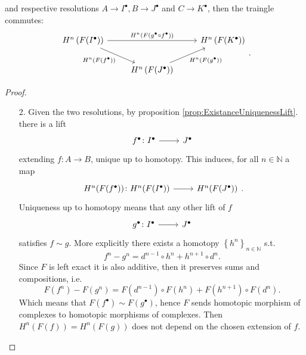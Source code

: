 \documentclass[../Main]{subfiles}
\begin{document}
\begin{prop}
\begin{enumerate}
	and respective resolutions $A \to I^\bullet, B \to J^\bullet$
	and $C \to K^\bullet$, then the traingle commutes:
	\begin{equation}
	\begin{tikzcd}
		H^{n} \left( F(I^\bullet) \right) 
		\arrow[rr, "H^{n} \left( F(g^\bullet \circ f^\bullet) \right)", rightarrow] 
		\arrow[rd, "H^{n} \left( F(f^\bullet) \right)"', rightarrow] & &
		H^{n} \left( F(K^\bullet) \right) \\
		&
		H^{n} \left( F(J^\bullet) \right) 
		\arrow[ru, "H^{n} \left( F(g^\bullet) \right)"', rightarrow] &
	\end{tikzcd}
	.\end{equation} 
\end{enumerate}
\end{prop}
\begin{proof}\leavevmode\vspace{-.2\baselineskip}
\begin{enumerate}
	\item[2.] Given the two resolutions, by proposition
		\ref{prop:ExistanceUniquenessLift}.
		there is a lift
		\begin{equation}
		\begin{tikzcd}
			f^\bullet\colon I^\bullet \arrow[r, "", rightarrow] &
			J^\bullet
		\end{tikzcd}
		\end{equation} 
		extending $f\colon A \to B$, unique up to homotopy.
		This induces, for all $n \in \mathbb{N}$ a map
		\begin{equation}
		\begin{tikzcd}
			H^n(F(f^\bullet))\colon H^n(F(I^\bullet)) \arrow[r, "", rightarrow] &
			H^n(F(J^\bullet))
		\end{tikzcd}
		.\end{equation} 
		Uniqueness up to homotopy means that any other lift of $f$
		\begin{equation}
		\begin{tikzcd}
			g^\bullet\colon I^\bullet \arrow[r, "", rightarrow] &
			J^\bullet
		\end{tikzcd}
		\end{equation} 
		satisfies $f \sim g$.
		More explicitly there exists a homotopy $\left\{ h^n \right\}_{n \in \mathbb{N}}$
		s.t.
		\begin{equation}
		f^n - g^n = d^{n-1} \circ h^n + h^{n+1} \circ d^n
		.\end{equation} 
		Since $F$ is left exact it is also additive,
		then it preserves sums and compositions, i.e.
		\begin{equation}
			F(f^n) - F(g^n) =
			F(d^{n-1}) \circ F(h^n) + F(h^{n+1}) \circ F(d^n)
		.\end{equation} 
		Which means that $F(f^\bullet) \sim F(g^\bullet)$, hence
		$F$ sends homotopic morphism of complexes
		to homotopic morphisms of complexes.
		Then $H^n(F(f)) = H^n(F(g))$ does not depend on the chosen extension of $f$.


\end{enumerate}
\end{proof}
\end{document}
